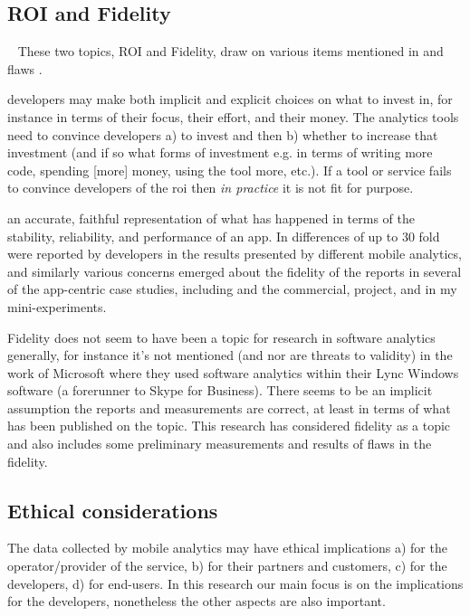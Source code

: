 \subsection{ROI and Fidelity}~\label{tata-roi-and-fidelity-topics}
These two topics, ROI and Fidelity, draw on various items mentioned in  and flaws .

 developers may make both implicit and explicit choices on what to invest in, for instance in terms of their focus, their effort, and their money. The analytics tools need to convince developers a) to invest and then b) whether to increase that investment (and if so what forms of investment e.g. in terms of writing more code, spending [more] money, using the tool more, etc.). If a tool or service fails to convince developers of the \Gls{roi} then \emph{in practice} it is not fit for purpose.
    
an accurate, faithful representation of what has happened in terms of the stability, reliability, and performance of an app. In  differences of up to 30 fold were reported by developers in the results presented by different mobile analytics, and similarly various concerns emerged about the fidelity of the reports in several of the app-centric case studies, including  and the commercial,  project, and in my mini-experiments.

Fidelity does not seem to have been a topic for research in software analytics generally, for instance it's not mentioned (and nor are threats to validity) in the work of Microsoft where they used software analytics within their Lync Windows software (a forerunner to Skype for Business). There seems to be an implicit assumption the reports and measurements are correct, at least in terms of what has been published on the topic. This research has considered fidelity as a topic and also includes some preliminary measurements and results of flaws in the fidelity.


\subsection{Ethical considerations}
The data collected by mobile analytics may have ethical implications a) for the operator/provider of the service, b) for their partners and customers, c) for the developers, d) for end-users. In this research our main focus is on the implications for the developers, nonetheless the other aspects are also important.


